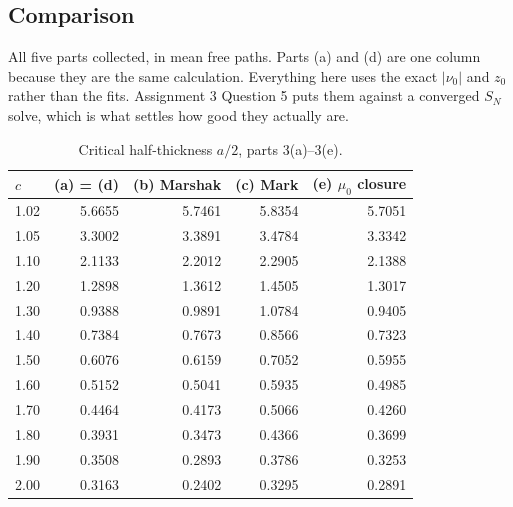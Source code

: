 \documentclass[11pt]{article}
\begin{document}
\subsection*{Comparison}
All five parts collected, in mean free paths. Parts (a) and (d) are one column because they are
the same calculation. Everything here uses the exact $|\nu_0|$ and $z_0$ rather than the fits.
Assignment 3 Question 5 puts them against a converged $S_N$ solve, which is what settles how good they actually are.

\begin{table}[hbt!]
    \centering
    \begin{tabular}{lrrrr}
        \toprule
        $c$ & (a) = (d) & (b) Marshak & (c) Mark & (e) $\mu_0$ closure \\
        \midrule
        1.02 & 5.6655 & 5.7461 & 5.8354 & 5.7051 \\
        1.05 & 3.3002 & 3.3891 & 3.4784 & 3.3342 \\
        1.10 & 2.1133 & 2.2012 & 2.2905 & 2.1388 \\
        1.20 & 1.2898 & 1.3612 & 1.4505 & 1.3017 \\
        1.30 & 0.9388 & 0.9891 & 1.0784 & 0.9405 \\
        1.40 & 0.7384 & 0.7673 & 0.8566 & 0.7323 \\
        1.50 & 0.6076 & 0.6159 & 0.7052 & 0.5955 \\
        1.60 & 0.5152 & 0.5041 & 0.5935 & 0.4985 \\
        1.70 & 0.4464 & 0.4173 & 0.5066 & 0.4260 \\
        1.80 & 0.3931 & 0.3473 & 0.4366 & 0.3699 \\
        1.90 & 0.3508 & 0.2893 & 0.3786 & 0.3253 \\
        2.00 & 0.3163 & 0.2402 & 0.3295 & 0.2891 \\
        \bottomrule
    \end{tabular}
    \caption{Critical half-thickness $a/2$, parts 3(a)--3(e).}
    \label{tab:q3all_slab}
\end{table}
\end{document}
